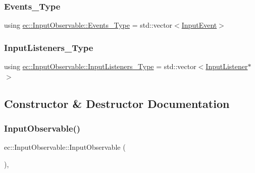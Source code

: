 \subsubsection{\texorpdfstring{Events\+\_\+\+Type}{Events\_Type}}
{\footnotesize\ttfamily using \mbox{\hyperlink{classec_1_1_input_observable_ac2476cc82c72ba20dcd8d5c89794f577}{ec\+::\+Input\+Observable\+::\+Events\+\_\+\+Type}} =  std\+::vector$<$\mbox{\hyperlink{structec_1_1_input_event}{Input\+Event}}$>$}

\mbox{\label{classec_1_1_input_observable_a7a1e7fe634b426e59ddae7f11c21bebb}} 
\subsubsection{\texorpdfstring{Input\+Listeners\+\_\+\+Type}{InputListeners\_Type}}
{\footnotesize\ttfamily using \mbox{\hyperlink{classec_1_1_input_observable_a7a1e7fe634b426e59ddae7f11c21bebb}{ec\+::\+Input\+Observable\+::\+Input\+Listeners\+\_\+\+Type}} =  std\+::vector$<$\mbox{\hyperlink{classec_1_1_input_listener}{Input\+Listener}}$\ast$$>$}



\subsection{Constructor \& Destructor Documentation}
\mbox{\label{classec_1_1_input_observable_a92422814189d1210f631f4d1378877f3}} 
\subsubsection{\texorpdfstring{Input\+Observable()}{InputObservable()}}
{\footnotesize\ttfamily ec\+::\+Input\+Observable\+::\+Input\+Observable (\begin{DoxyParamCaption}{ }\end{DoxyParamCaption})\hspace{0.3cm}{\ttfamily [explicit]}, {\ttfamily [default]}}

